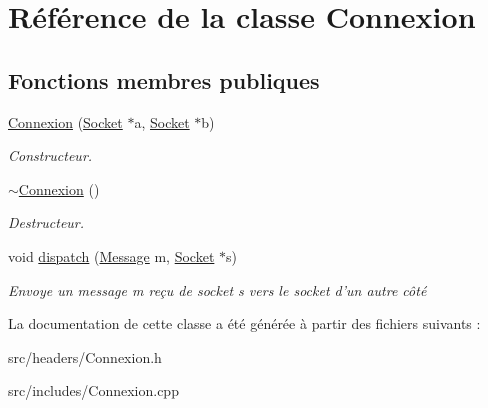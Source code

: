 \hypertarget{classConnexion}{\section{Référence de la classe Connexion}
\label{classConnexion}
}
\subsection*{Fonctions membres publiques}
\begin{DoxyCompactItemize}
\item 
\hypertarget{classConnexion_a31fda5acfafb5ec2de7ae76cfce373a7}{\hyperlink{classConnexion_a31fda5acfafb5ec2de7ae76cfce373a7}{Connexion} (\hyperlink{classSocket}{Socket} $\ast$a, \hyperlink{classSocket}{Socket} $\ast$b)}\label{classConnexion_a31fda5acfafb5ec2de7ae76cfce373a7}

\begin{DoxyCompactList}\small\item\em Constructeur. \end{DoxyCompactList}\item 
\hypertarget{classConnexion_a6afee761c33e160c2be5e9e2713968e3}{\hyperlink{classConnexion_a6afee761c33e160c2be5e9e2713968e3}{$\sim$\-Connexion} ()}\label{classConnexion_a6afee761c33e160c2be5e9e2713968e3}

\begin{DoxyCompactList}\small\item\em Destructeur. \end{DoxyCompactList}\item 
\hypertarget{classConnexion_ad2705670b0a7be05ff09ba1294f57200}{void \hyperlink{classConnexion_ad2705670b0a7be05ff09ba1294f57200}{dispatch} (\hyperlink{classMessage}{Message} m, \hyperlink{classSocket}{Socket} $\ast$s)}\label{classConnexion_ad2705670b0a7be05ff09ba1294f57200}

\begin{DoxyCompactList}\small\item\em Envoye un message m reçu de socket s vers le socket d'un autre côté \end{DoxyCompactList}\end{DoxyCompactItemize}


La documentation de cette classe a été générée à partir des fichiers suivants \-:\begin{DoxyCompactItemize}
\item 
src/headers/Connexion.\-h\item 
src/includes/Connexion.\-cpp\end{DoxyCompactItemize}
